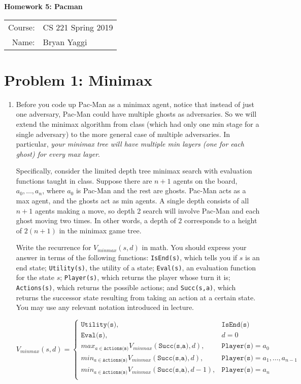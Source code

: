 \documentclass[10pt]{article}
\begin{document}
\begin{center}
{\Large \textbf{Homework 5: Pacman}}

\begin{tabular}{rl}
\\
Course: & CS 221 Spring 2019 \\
Name: & Bryan Yaggi
\end{tabular}
\end{center}

\section*{\normalsize Problem 1: Minimax}

\begin{enumerate}[label=(\alph*)]

  \item Before you code up Pac-Man as a minimax agent, notice that instead of just one adversary, Pac-Man could have multiple ghosts as adversaries. So we will extend the minimax algorithm from class (which had only one min stage for a single adversary) to the more general case of multiple adversaries. In particular, \textit{your minimax tree will have multiple min layers (one for each ghost) for every max layer}.
  
  Specifically, consider the limited depth tree minimax search with evaluation functions taught in class. Suppose there are $n+1$ agents on the board, $a_0, \dots, a_n$, where $a_0$ is Pac-Man and the rest are ghosts. Pac-Man acts as a max agent, and the ghosts act as min agents. A single depth consists of all $n+1$ agents making a move, so depth 2 search will involve Pac-Man and each ghost moving two times. In other words, a depth of 2 corresponds to a height of $2(n+1)$ in the minimax game tree.
  
  Write the recurrence for $V_{minmax}(s,d)$ in math. You should express your answer in terms of the following functions: \texttt{IsEnd(s)}, which tells you if $s$ is an end state; \texttt{Utility(s)}, the utility of a state; \texttt{Eval(s)}, an evaluation function for the state $s$; \texttt{Player(s)}, which returns the player whose turn it is; \texttt{Actions(s)}, which returns the possible actions; and \texttt{Succ(s,a)}, which returns the successor state resulting from taking an action at a certain state. You may use any relevant notation introduced in lecture.
  
  $$
  V_{minmax}(s,d) = \begin{cases}
  \texttt{Utility(s)}, &\texttt{IsEnd(s)}\\
  \texttt{Eval(s)}, &d = 0\\
  max_{a \in \texttt{Actions(s)}}V_{minmax}(\texttt{Succ(s,a)},d), &\texttt{Player(s)} = a_0\\
  min_{a \in \texttt{Actions(s)}}V_{minmax}(\texttt{Succ(s,a)},d), &\texttt{Player(s)} = a_1, \dots, a_{n-1}\\
  min_{a \in \texttt{Actions(s)}}V_{minmax}(\texttt{Succ(s,a)},d-1), &\texttt{Player(s)} = a_n\\
  \end{cases}
  $$
  

\end{enumerate}
\end{document}
